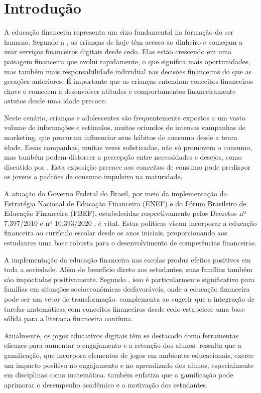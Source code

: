 \chapter{Introdução}

A educação financeira representa um eixo fundamental na formação do ser humano. Segundo a \cite{OECD}, as crianças de hoje têm acesso ao dinheiro e começam a usar serviços financeiros digitais desde cedo. Elas estão crescendo em uma paisagem financeira que evolui rapidamente, o que significa mais oportunidades, mas também mais responsabilidade individual nas decisões financeiras do que as gerações anteriores. É importante que as crianças entendam conceitos financeiros chave e comecem a desenvolver atitudes e comportamentos financeiramente astutos desde uma idade precoce.

Neste cenário, crianças e adolescentes são frequentemente expostos a um vasto volume de informações e estímulos, muitos oriundos de intensas campanhas de marketing, que procuram influenciar seus hábitos de consumo desde a tenra idade. Essas campanhas, muitas vezes sofisticadas, não só promovem o consumo, mas também podem distorcer a percepção entre necessidades e desejos, como discutido por \cite{Junger_Medeiros_Moura_Barrocal_Amaral_2019}. Esta exposição precoce aos conceitos de consumo pode predispor os jovens a padrões de consumo impulsivo na maturidade.

A atuação do Governo Federal do Brasil, por meio da implementação da Estratégia Nacional de Educação Financeira (ENEF) e do Fórum Brasileiro de Educação Financeira (FBEF), estabelecidas respectivamente pelos Decretos nº 7.397/2010 e nº 10.393/2020 \cite{decreto_10939}, é vital. Estas políticas visam incorporar a educação financeira ao currículo escolar desde os anos iniciais, proporcionando aos estudantes uma base robusta para o desenvolvimento de competências financeiras.

A implementação da educação financeira nas escolas produz efeitos positivos em toda a sociedade. Além do benefício direto aos estudantes, suas famílias também são impactadas positivamente. Segundo \cite{Frisancho2023Spillover}, isso é particularmente significativo para famílias em situações socioeconômicas desfavoráveis, onde a educação financeira pode ser um vetor de transformação. \cite{Ozkale2023Designing} complementa ao sugerir que a integração de tarefas matemáticas com conceitos financeiros desde cedo estabelece uma base sólida para a literacia financeira contínua.

Atualmente, os jogos educativos digitais têm se destacado como ferramentas eficazes para aumentar o engajamento e a retenção dos alunos. \cite{lee2023} ressalta que a gamificação, que incorpora elementos de jogos em ambientes educacionais, exerce um impacto positivo no engajamento e no aprendizado dos alunos, especialmente em disciplinas como matemática. \cite{dahalan2023} também enfatiza que a gamificação pode aprimorar o desempenho acadêmico e a motivação dos estudantes.

